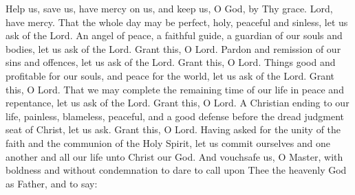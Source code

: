 \begin{liturgicaltext}
    \deacon Help us, save us, have mercy on us, and keep us, O God, by Thy grace.
    \choir Lord, have mercy.
    \deacon That the whole day may be perfect, holy, peaceful and sinless, let us ask of the Lord. 
    \choir {}
    \deacon An angel of peace, a faithful guide, a guardian of our souls and bodies, let us ask of the Lord.
    \choir Grant this, O Lord.
    \deacon Pardon and remission of our sins and offences, let us ask of the Lord.
    \choir Grant this, O Lord.
    \deacon Things good and profitable for our souls, and peace for the world, let us ask of the Lord. 
    \choir Grant this, O Lord.
    \deacon That we may complete the remaining time of our life in peace and repentance, let us ask of the Lord. 
    \choir Grant this, O Lord.
    \deacon A Christian ending to our life, painless, blameless, peaceful, and a good defense before the dread judgment seat of Christ, let us ask. 
    \choir Grant this, O Lord.
    \deacon Having asked for the unity of the faith and the communion of the Holy Spirit, let us commit ourselves and one another and all our life unto Christ our God.
    \choir {}
    \priest And vouchsafe us, O Master, with boldness and without condemnation to dare to call upon Thee the heavenly God as Father, and to say:
\end{liturgicaltext}


